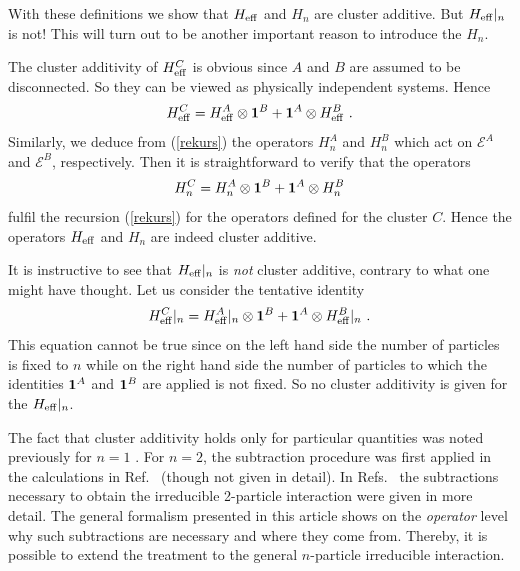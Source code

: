With these definitions we show that $H_{\rm eff}$ and $H_n$
are cluster additive. But $H_{\rm eff}|_n$ is not! This will turn out
to be another important reason to introduce the $H_n$.

The cluster additivity of $H_{\rm eff}^C$ is obvious since $A$ and 
$B$ are assumed to be disconnected. So they can be viewed as physically
independent systems. Hence
\begin{equation}
  \label{sep_1}
  H_{\rm eff}^C = H_{\rm eff}^A\otimes{\bf 1}^B + {\bf 1}^A\otimes
  H_{\rm eff}^B\ .
\end{equation}
Similarly, we deduce from (\ref{rekurs}) the operators
$H^A_n$ and $H^B_n$ which act on ${\mathcal E}^A$ and  ${\mathcal E}^B$,
respectively. Then it is straightforward to verify that the operators
\begin{equation}
H^C_n  = H_n^A\otimes{\bf 1}^B + {\bf 1}^A\otimes  H_n^B
\end{equation}
fulfil the recursion (\ref{rekurs}) for the operators defined for
the cluster $C$. Hence the operators $H_{\rm eff}$ and $H_n$ are
indeed cluster additive.

It is instructive to see that $H_{\rm eff}|_n$ is {\it not}
cluster additive, contrary to what one might have thought.
Let us consider the tentative identity
\begin{equation}
\label{wrong}
H_{\rm eff}^C|_n = H_{\rm eff}^A|_n\otimes{\bf 1}^B + {\bf 1}^A\otimes
 H_{\rm eff}^B|_n\ .
\end{equation}
This equation cannot be true since on the left hand side the number of
particles is fixed to $n$ while on the right hand side the number
of particles to which the identities ${\bf 1}^A$ and ${\bf 1}^B$
are applied is not fixed. So no cluster additivity is given for the
$H_{\rm eff}|_n$.

The fact that cluster additivity holds only for particular quantities
 was noted previously for $n=1$ \cite{gelfa96}.
For $n=2$, the subtraction procedure was first applied in the calculations
in Ref.~ (though not given in detail). In 
Refs.~ the subtractions
necessary to obtain the irreducible 2-particle interaction were given in 
more detail. The general formalism presented in this article shows
on the {\it operator} level why such subtractions are necessary and where they 
come from. Thereby, it is possible to extend the treatment to 
 the general $n$-particle irreducible interaction. 

